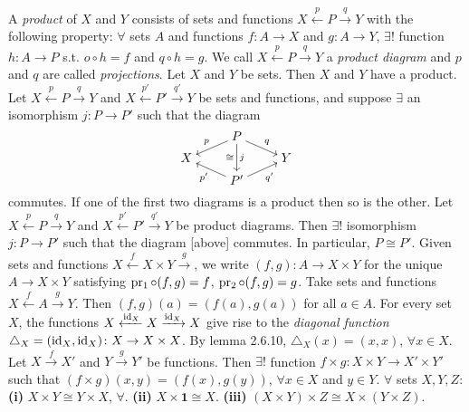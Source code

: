  A \textit{product} of $X$ and $Y$ consists of sets and functions $X \xleftarrow{p} P \xrightarrow{q} Y$ with the following property: $\forall$ sets $A$ and functions $f \colon A \to X$ and $g \colon A \to Y$, $\exists!$ function $h \colon A \to P$ s.t. $o \circ h = f$ and $q \circ h = g$. We call $X \xleftarrow{p} P \xrightarrow{q} Y$ a \textit{product diagram} and $p$ and $q$ are called \textit{projections}.
 Let $X$ and $Y$ be sets. Then $X$ and $Y$ have a product.
 Let $X \xleftarrow{p} P \xrightarrow{q} Y$ and $X \xleftarrow{p'} P' \xrightarrow{q'} Y$ be sets and functions, and suppose $\exists$ an isomorphism $j \colon P \to P'$ such that the diagram
\[\begin{tikzcd}[cramped, row sep=tiny]
    & P \\
    X && Y \\
    & {P'}
    \arrow["p"', from=1-2, to=2-1]
    \arrow["q", from=1-2, to=2-3]
    \arrow["j", "\cong"', from=1-2, to=3-2]
    \arrow["{p'}", from=3-2, to=2-1]
    \arrow["{q'}"', from=3-2, to=2-3]
\end{tikzcd}\]\linebreak
commutes. If one of the first two diagrams is a product then so is the other.
 Let $X \xleftarrow{p} P \xrightarrow{q} Y$ and $X \xleftarrow{p'} P' \xrightarrow{q'} Y$ be product diagrams. Then $\exists!$ isomorphism $j \colon P \to P'$ such that the diagram [above] commutes. In particular, $P \cong P'$.
 Given sets and functions $X \xleftarrow{f} X \times Y \xrightarrow{g}$, we write $(f, g) \colon A \to X \times Y$ for the unique $A \to X \times Y$ satisfying $\operatorname{pr_1} \circ (f, g) = f$, $\operatorname{pr_2} \circ (f, g) = g$.
 Take sets and functions $X \xleftarrow{f} A \xrightarrow{g} Y$. Then $(f, g)(a) = (f(a), g(a))$ for all $a \in A$.
 For every set $X$, the functions $X \xleftarrow{\operatorname{id}_X} X \xrightarrow{\operatorname{id}_X} X$ give rise to the \textit{diagonal function} $\triangle_X = (\operatorname{id}_X, \operatorname{id}_X) \colon X \to X \times X$. By lemma 2.6.10, $\triangle_X(x) = (x, x)$, $\forall x \in X$.
 Let $X \xrightarrow{f} X'$ and $Y \xrightarrow{g} Y'$ be functions. Then $\exists!$ function $f \times g \colon X \times Y \to X' \times Y'$ such that $(f \times g)(x, y) = (f(x), g(y))$, $\forall x \in X$ and $y \in Y$.
 $\forall$ sets $X, Y, Z$: \textbf{(i)} $X \times Y \cong Y \times X$, $\forall$. \textbf{(ii)} $X \times \textbf{1} \cong X$. \textbf{(iii)} $(X \times Y) \times Z \cong X \times (Y \times Z)$.
